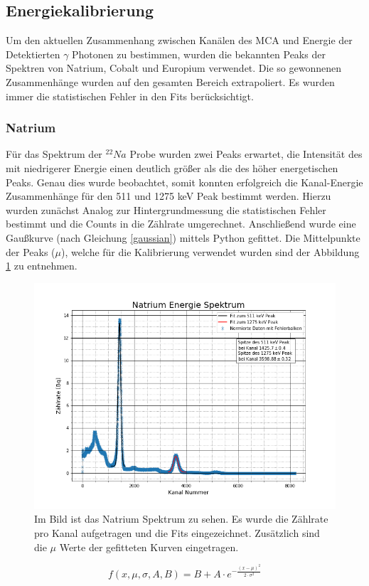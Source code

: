 \subsection{Energiekalibrierung}
Um den aktuellen Zusammenhang zwischen Kanälen des MCA und Energie der Detektierten $\gamma$ Photonen zu bestimmen, wurden die bekannten Peaks der Spektren von Natrium, Cobalt und Europium verwendet. Die so gewonnenen Zusammenhänge wurden auf den gesamten Bereich extrapoliert. Es wurden immer die statistischen Fehler in den Fits berücksichtigt.
\subsubsection{Natrium}
Für das Spektrum der $^{22}Na$ Probe wurden zwei Peaks erwartet, die Intensität des mit niedrigerer Energie einen deutlich größer als die des höher energetischen Peaks. Genau dies wurde beobachtet, somit konnten erfolgreich die Kanal-Energie Zusammenhänge für den 511 und 1275 keV Peak bestimmt werden. Hierzu wurden zunächst Analog zur Hintergrundmessung die statistischen Fehler bestimmt und die Counts in die Zählrate umgerechnet. 
Anschließend wurde eine Gaußkurve (nach Gleichung \ref{gaussian}) mittels Python \cite{SciPy_Opti} gefittet. Die Mittelpunkte der Peaks ($\mu$), welche für die Kalibrierung verwendet wurden sind der Abbildung \ref{natrium} zu entnehmen. 
\begin{figure}[h]
	\centering
	\includegraphics[scale=0.5]{Bilder/Natrium}
	\caption[Natriumspektrum mit Peaks]{\small Im Bild ist das Natrium Spektrum zu sehen. Es wurde die Zählrate pro Kanal aufgetragen und die Fits eingezeichnet. Zusätzlich sind die $\mu$ Werte der gefitteten Kurven eingetragen.}
	\label{natrium}
\end{figure}
\begin{equation}
f(x,\mu, \sigma, A, B) = B + A \cdot e ^{-\frac{(x - \mu) ^ 2}{2 \cdot \sigma ^ 2}}
\label{gaussian}
\end{equation}
